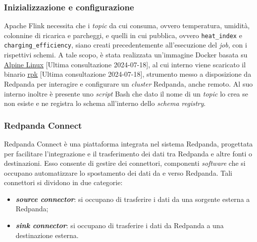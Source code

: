 \subsubsection{Inizializzazione e configurazione}
Apache Flink necessita che i \textit{topic} da cui consuma, ovvero temperatura, umidità, colonnine di ricarica e parcheggi, e quelli in cui pubblica, ovvero \texttt{heat\_index} e \texttt{charging\_efficiency},
siano creati precedentemente all'esecuzione del \textit{job}, con i rispettivi schemi. A tale scopo, è stata realizzata un'immagine Docker basata su \href{https://hub.docker.com/_/alpine}{\underline{Alpine Linux}} [Ultima consultazione 2024-07-18],
al cui interno viene scaricato il binario \href{https://docs.redpanda.com/current/get-started/intro-to-rpk/}{\underline{rpk}} [Ultima consultazione 2024-07-18], strumento
messo a disposizione da Redpanda per interagire e configurare un \textit{cluster} Redpanda, anche remoto. Al suo interno inoltre è presente uno \textit{script} Bash che
dato il nome di un \textit{topic} lo crea se non esiste e ne registra lo schema all'interno dello \textit{schema registry}.

\subsubsection{Redpanda Connect}\label{redpanda_connect}
Redpanda Connect è una piattaforma integrata nel sistema Redpanda, progettata per facilitare l'integrazione e il trasferimento dei dati tra Redpanda e altre fonti o destinazioni.
Esso consente di gestire dei connettori, componenti \textit{software} che si occupano automatizzare lo spostamento dei dati da e verso Redpanda. Tali connettori si dividono in due categorie:
\begin{itemize}
	\item \textbf{\textit{source connector}}: si occupano di trasferire i dati da una sorgente esterna a Redpanda;
	\item \textbf{\textit{sink connector}}: si occupano di trasferire i dati da Redpanda a una destinazione esterna.
\end{itemize}

